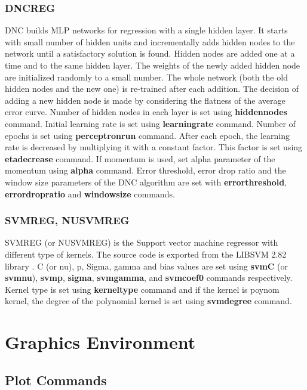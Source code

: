 \documentclass[a4paper,12pt]{book}
\begin{document}
\subsection{DNCREG}
DNC \cite{ash89dynamic} builds MLP networks for regression with a single hidden layer. It starts with small number of hidden units and incrementally adds hidden nodes to the network until a satisfactory solution is found. Hidden nodes are added one at a time and to the same hidden layer. The weights of the newly added hidden node are initialized randomly to a small number. The whole network (both the old hidden nodes and the new one) is re-trained after each addition. The decision of adding a new hidden node is made by considering the flatness of the average error curve. Number of hidden nodes in each layer is set using {\bf hiddennodes} command. Initial learning rate is set using {\bf learningrate} command. Number of epochs is set using {\bf perceptronrun} command. After each epoch, the learning rate is decreased by multiplying it with a constant factor. This factor is set using {\bf etadecrease} command. If momentum is used, set alpha parameter of the momentum using {\bf alpha} command. Error threshold, error drop ratio and the window size parameters of the DNC algorithm are set with {\bf errorthreshold}, {\bf errordropratio} and {\bf windowsize} commands.

\subsection{SVMREG, NUSVMREG}
SVMREG (or NUSVMREG) is the Support vector machine regressor with different type of kernels. The source code is exported from the LIBSVM 2.82 library \cite{libsvm}. C (or nu), p, Sigma, gamma and bias values are set using {\bf svmC} (or {\bf svmnu}), {\bf svmp}, {\bf sigma}, {\bf svmgamma}, and {\bf svmcoef0} commands respectively. Kernel type is set using {\bf kerneltype} command and if the kernel is poynom kernel, the degree of the polynomial kernel is set using {\bf svmdegree} command.

\chapter{Graphics Environment}

\section{Plot Commands}
\end{document}
